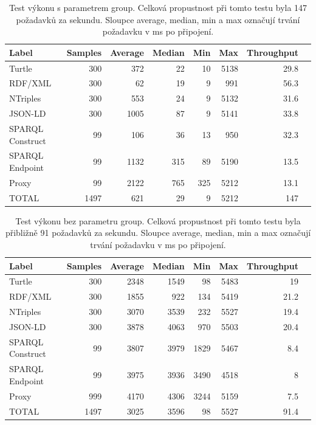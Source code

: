 \documentclass[thesis=B,czech]{FITthesis}[2012/06/26]
\begin{document}
  \begin{table}\centering
 	\caption[Test výkonu - s parametrem group]{Test výkonu s parametrem group. Celková propustnost při tomto testu byla 147 požadavků za sekundu. Sloupce average, median, min a max označují trvání požadavku v ms po připojení.}\label{performance1}
 	\begin{tabular}{|l|r|r|r|r|r|r|r|}\hline
Label				& 	Samples&	Average &	Median &Min &	Max &		Throughput \tabularnewline \hline \hline
 Turtle		&	300	&	372	&	22&	10 &	5138&		29.8\tabularnewline \hline
 RDF/XML 		&	300	&	62	&	19&	9&	991	&	56.3\tabularnewline \hline
 NTriples 		&	300	&	553	&	24&	9&	5132 	&	31.6\tabularnewline \hline
 JSON-LD 		&	300	&	1005	&	87&	9&	5141 	&	33.8\tabularnewline \hline
 SPARQL Construct 	&	99	&	106	&	36&	13&	950 	&	32.3\tabularnewline \hline
 SPARQL Endpoint 	&	99	&	1132	&	315&	89&	5190 	&	13.5\tabularnewline \hline
 Proxy 		&	99	&	2122	&	765&	325&	5212 	&	13.1\tabularnewline \hline
TOTAL				&	1497	&	621	&	29&	9&	5212 	&	147\tabularnewline \hline
 	\end{tabular}
 \end{table}
 
   \begin{table}\centering
 	\caption[Test výkonu - bez parametru group]{Test výkonu bez parametru group. Celková propustnost při tomto testu byla přibližně 91 požadavků za sekundu. Sloupce average, median, min a max označují trvání požadavku v ms po připojení.}\label{performance2}
 	\begin{tabular}{|l|r|r|r|r|r|r|r|}\hline
Label				& 	Samples&	Average &	Median &Min &	Max &		Throughput \tabularnewline \hline \hline
 Turtle				&300	&2348	&1549	&98	&5483	&19\tabularnewline \hline
 RDF/XML 			&300	&1855	&922	&134	&5419	&21.2\tabularnewline \hline
 NTriples 			&300	&3070	&3539	&232	&5527	&19.4\tabularnewline \hline
 JSON-LD 			&300	&3878	&4063	&970	&5503	&20.4\tabularnewline \hline
 SPARQL Construct 		&99	&3807	&3979	&1829	&5467	&8.4\tabularnewline \hline
 SPARQL Endpoint 		&99	&3975	&3936	&3490	&4518	&8\tabularnewline \hline
 Proxy 				&999	&4170	&4306	&3244	&5159	&7.5\tabularnewline \hline
TOTAL				&1497	&3025	&3596	&98	&5527	&91.4\tabularnewline \hline
 	\end{tabular}
 \end{table}
  
\end{document}

